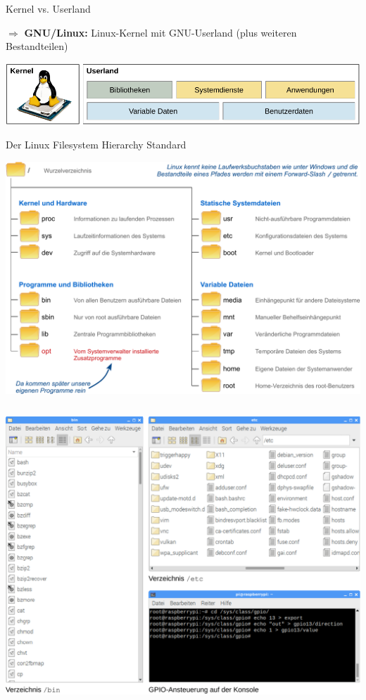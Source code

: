 {\begin{frame}{Kernel vs. Userland}
    \vfill

    $\Rightarrow$ \textbf{GNU/Linux:} Linux-Kernel mit GNU-Userland (plus weiteren Bestandteilen)
    \medskip

    \includegraphics[width=\textwidth]{8-linux/img/linux-bestandteile}
\end{frame}
}

{
\footnotesize

\begin{frame}[allowframebreaks]{Der Linux Filesystem Hierarchy Standard}
    \begin{center}
        \includegraphics[width=\textwidth]{8-linux/img/fhs-verzeichnisse}
    \end{center}

    \framebreak

    \begin{columns}[T]
        \includegraphics[width=\textwidth]{8-linux/img/fhs-beispiele}


\end{columns}
\end{frame}}
